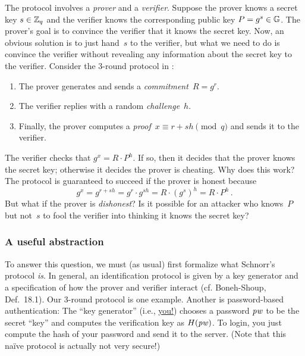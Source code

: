 \documentclass{article}
\theoremstyle{remark}
\begin{document}
\noindent The protocol involves a \emph{prover} and a \emph{verifier}. Suppose
the prover knows a secret key $s\in\mathbb{Z}_q$ and the verifier knows the
corresponding public key $P=g^s\in\mathbb{G}$. The prover's goal is to convince the
verifier that it knows the secret key. Now, an obvious solution is to just
hand~$s$ to the verifier, but what we need to do is convince the verifier
without revealing any information about the secret key to the verifier. Consider
the 3-round protocol in :
\begin{enumerate}
  \item The prover generates and sends a \emph{commitment}~$R=g^r$.
  \item The verifier replies with a random \emph{challenge}~$h$.
  \item Finally, the prover computes a \emph{proof}~$x\equiv r+sh \pmod q$ and
    sends it to the verifier.
\end{enumerate}
%
The verifier checks that $g^x = R\cdot P^h$. If so, then it decides that the
prover knows the secret key; otherwise it decides the prover is cheating.
%
Why does this work? The protocol is guaranteed to succeed if the prover is
honest because
%
\begin{equation}
  g^x = g^{r + sh} = g^r \cdot g^{sh} = R \cdot (g^{s})^h = R \cdot P^h
  \,.
\end{equation}
%
But what if the prover is \emph{dishonest}? Is it possible for an attacker who
knows~$P$ but not~$s$ to fool the verifier into thinking it knows the secret key?

\subsubsection{A useful abstraction}

To answer this question, we must (as usual) first formalize what Schnorr's
protocol \emph{is}.
%
In general, an identification protocol is given by a key generator and a
specification of how the prover and verifier interact (cf. Boneh-Shoup,
Def.~18.1). Our 3-round protocol is one example. Another is password-based
authentication: The ``key generator'' (i.e., \underline{you!}) chooses a
password $\mathit{pw}$ to be the secret ``key'' and computes the verification key as
$H(\mathit{pw})$. To login, you just compute the hash of your password and send it to
the server. (Note that this na\"ive protocol is
actually not very secure!)
\end{document}
